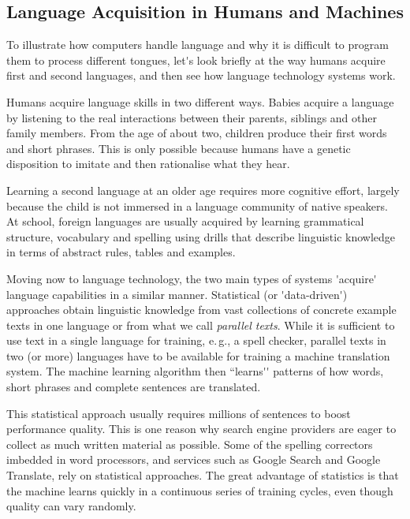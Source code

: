 \documentclass[]{../metanetpaper}
\begin{document}
\begin{multicols}{2}
\subsection{Language Acquisition in Humans and Machines}

To illustrate how computers handle language and why it is difficult to program them to process different tongues, let{\mbox '}s look briefly at the way humans acquire first and second languages, and then see how language technology systems work.

Humans acquire language skills in two different ways. Babies acquire a language by listening to the real interactions between their parents, siblings and other family members. From the age of about two, children produce their first words and short phrases. This is only possible because humans have a genetic disposition to imitate and then rationalise what they hear. 

Learning a second language at an older age requires more cognitive effort, largely because the child is not immersed in a language community of native speakers. At school, foreign languages are usually acquired by learning grammatical structure, vocabulary and spelling using drills that describe linguistic knowledge in terms of abstract rules, tables and examples.


Moving now to language technology, the two main types of systems
{\mbox '}acquire{\mbox '} language capabilities in a similar
manner. Statistical (or {\mbox '}data-driven{\mbox '}) approaches
obtain linguistic knowledge from vast collections of concrete example
texts in one language or from what we call {\em parallel texts}. While
it is sufficient to use text in a single language for training,
e.\,g., a spell checker, parallel texts in two (or more) languages
have to be available for training a machine translation system. The
machine learning algorithm then ``learns{\mbox '}{\mbox '} patterns of
how words, short phrases and complete sentences are translated.

This statistical approach usually requires millions of sentences to boost performance quality. This is one reason why search engine providers are eager to collect as much written material as possible. Some of the spelling correctors imbedded in word processors, and services such as Google Search and Google Translate, rely on statistical approaches. The great advantage of statistics is that the machine learns quickly in a continuous series of training cycles, even though quality can vary randomly.


\end{multicols}
\end{document}
